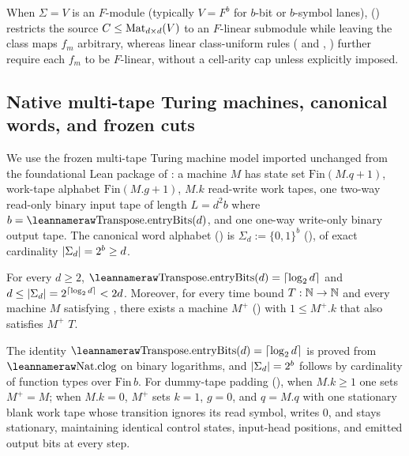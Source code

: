 When $\Sigma = V$ is an $F$-module (typically $V = F^b$ for $b$-bit or $b$-symbol lanes),
 (\cite[Definition~2.1]{SharedDecoders2026}) restricts the
source $C \le \operatorname{Mat}_{d\times d}(V)$ to an $F$-linear submodule while leaving the class maps $f_m$
arbitrary, whereas linear class-uniform rules ( and
, \cite[Definition~6.3]{SeventeenthPaper2026}) further
require each $f_m$ to be $F$-linear, without a cell-arity cap unless explicitly imposed.

\subsection{Native multi-tape Turing machines, canonical words, and frozen cuts}\label{sec:defs-tm}

We use the frozen multi-tape Turing machine model  imported unchanged from
the foundational Lean package of \cite[Definition~2.1]{FirstPaper2026}: a machine $M$ has state
set $\mathrm{Fin}(M.q + 1)$, work-tape alphabet $\mathrm{Fin}(M.g + 1)$, $M.k$ read-write work
tapes, one two-way read-only binary input tape of length $L = d^2 b$ where
$b = \leanname{Transpose.entryBits}(d)$, and one one-way write-only binary output tape.
The canonical word alphabet () is
$\Sigma_d := \{0,1\}^b$ (), of exact cardinality
$\lvert \Sigma_d \rvert = 2^b \ge d$.

\begin{lemma}\label{lem:pad-dummy-tape}
For every $d \ge 2$, $\leanname{Transpose.entryBits}(d) = \clog{d}$ and
$d \le \lvert \Sigma_d \rvert = 2^{\lceil \log_2 d \rceil} < 2d$. Moreover, for every time bound $T : \mathbb{N} \to \mathbb{N}$ and
every machine $M$ satisfying , there exists a machine
$M^+$ () with $1 \le M^+.k$ that also satisfies
 $M^+$ $T$.
\end{lemma}
\begin{outline}
The identity $\leanname{Transpose.entryBits}(d) = \clog{d}$ is proved from
$\leanname{Nat.clog}$ on binary logarithms, and $\lvert \Sigma_d \rvert = 2^b$ follows by cardinality of
function types over $\mathrm{Fin}\,b$. For dummy-tape padding
(), when $M.k \ge 1$ one sets $M^+ = M$; when $M.k = 0$,
$M^+$ sets $k = 1$, $g = 0$, and $q = M.q$ with one stationary blank work tape whose transition
ignores its read symbol, writes $0$, and stays stationary, maintaining identical control states,
input-head positions, and emitted output bits at every step.
\end{outline}

